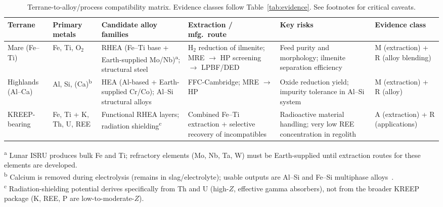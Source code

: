 \documentclass[11pt,a4paper]{article}
\begin{document}
\begin{landscape}
\begin{table}[p]
\centering
\caption{Terrane-to-alloy/process compatibility matrix. Evidence classes follow Table~\ref{tab:evidence}. See footnotes for critical caveats.}
\label{tab:compat}
\small
\begin{tabular}{p{2.4cm} p{2.2cm} p{4.2cm} p{3.2cm} p{4.5cm} p{2.8cm}}
\toprule
\textbf{Terrane} & \textbf{Primary metals} & \textbf{Candidate alloy families} & \textbf{Extraction / mfg.\ route} & \textbf{Key risks} & \textbf{Evidence class} \\
\midrule
Mare (Fe--Ti) & Fe, Ti, O$_2$ &
  RHEA (Fe--Ti base + Earth-supplied Mo/Nb)\textsuperscript{a}; structural steel &
  H$_2$ reduction of ilmenite; MRE $\rightarrow$ HP screening $\rightarrow$ LPBF/DED &
  Feed purity and morphology; ilmenite separation efficiency &
  M (extraction) + R (alloy blending) \\[6pt]
Highlands (Al--Ca) & Al, Si, (Ca)\textsuperscript{b} &
  HEA (Al-based + Earth-supplied Cr/Co); Al--Si structural alloys &
  FFC-Cambridge; MRE $\rightarrow$ HP &
  Oxide reduction yield; impurity tolerance in Al--Si system &
  M (extraction) + R (alloy) \\[6pt]
KREEP-bearing & Fe, Ti + K, Th, U, REE &
  Functional RHEA layers; radiation shielding\textsuperscript{c} &
  Combined Fe--Ti extraction + selective recovery of incompatibles &
  Radioactive material handling; very low REE concentration in regolith &
  A (extraction) + R (applications) \\
\bottomrule
\end{tabular}

\vspace{0.5em}
\raggedright\footnotesize
\textsuperscript{a} Lunar ISRU produces bulk Fe and Ti; refractory elements (Mo, Nb, Ta, W) must be Earth-supplied until extraction routes for these elements are developed.\\
\textsuperscript{b} Calcium is removed during electrolysis (remains in slag/electrolyte); usable outputs are Al--Si and Fe--Si multiphase alloys~\cite{Lomax2020}.\\
\textsuperscript{c} Radiation-shielding potential derives specifically from Th and U (high-$Z$, effective gamma absorbers), not from the broader KREEP package (K, REE, P are low-to-moderate-$Z$).
\end{table}
\end{landscape}
\end{document}

